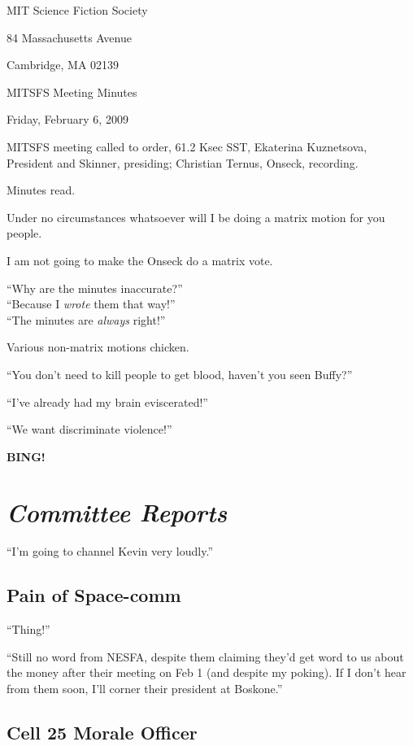 \documentclass[10pt]{article}
\newcommand{\bing}{{\bf BING!} }
\newcommand{\goto}[1]{\bing \vskip 12pt \section*{{\em{#1}}}}
\begin{document}
\begin{center}

MIT Science Fiction Society

84 Massachusetts Avenue

Cambridge, MA 02139

\vspace{12pt}

MITSFS Meeting Minutes

Friday, February 6, 2009

\end{center}

\vspace{18pt}

\setlength{\parskip}{6pt}

\noindent
MITSFS meeting called to order, 61.2 Ksec SST,
Ekaterina Kuznetsova, President and Skinner, presiding; Christian Ternus, Onseck, recording.

Minutes read.

Under no circumstances whatsoever will I be doing a matrix motion for
you people.

I am not going to make the Onseck do a matrix vote.

``Why are the minutes inaccurate?''\\
``Because I \emph{wrote} them that way!''\\
``The minutes are \emph{always} right!''

Various non-matrix motions chicken.

``You don't need to kill people to get blood, haven't you seen Buffy?''

``I've already had my brain eviscerated!''

``We want discriminate violence!''

\goto{Committee Reports}

``I'm going to channel Kevin very loudly.''

\subsection*{Pain of Space-comm}

``Thing!''

``Still no word from NESFA, despite them claiming they'd get word to us
about the money after their meeting on Feb 1 (and despite my
poking). If I don't hear from them soon, I'll corner their president
at Boskone.''

\subsection*{Cell 25 Morale Officer}
\end{document}
